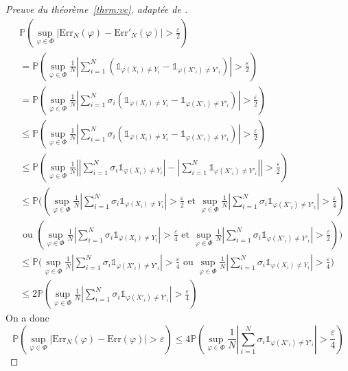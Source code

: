 \begin{proof}[Preuve du théorème~\ref{thrm:vc}, adaptée de \citet{Devroye1997}]
    \begin{align*}
        &\mathbb{P} \left( \sup_{\varphi \in \Phi} \left\vert \mathrm{Err}_N (\varphi) - \mathrm{Err}'_N (\varphi) \right\vert > \frac{\varepsilon}{2} \right) \\
        &= \mathbb{P} \left( \sup_{\varphi \in \Phi} \frac{1}{N} \left\vert \sum_{i=1}^N ( \mathds{1}_{\varphi (X_i) \neq Y_i} - \mathds{1}_{\varphi (X'_i) \neq Y'_i} )  \right\vert > \frac{\varepsilon}{2}\right) \\
        &= \mathbb{P} \left( \sup_{\varphi \in \Phi} \frac{1}{N} \left\vert \sum_{i=1}^N \sigma_i ( \mathds{1}_{\varphi (X_i) \neq Y_i} - \mathds{1}_{\varphi (X'_i) \neq Y'_i} )  \right\vert > \frac{\varepsilon}{2}\right) \\
        &\leq \mathbb{P} \left( \sup_{\varphi \in \Phi} \frac{1}{N} \left\vert \sum_{i=1}^N \sigma_i ( \mathds{1}_{\varphi (X_i) \neq Y_i} - \mathds{1}_{\varphi (X'_i) \neq Y'_i} )  \right\vert > \frac{\varepsilon}{2}\right) \\
        &\leq \mathbb{P} \left( \sup_{\varphi \in \Phi} \frac{1}{N} \left\vert \left\vert \sum_{i=1}^N \sigma_i  \mathds{1}_{\varphi (X_i) \neq Y_i} \right\vert - \left\vert \sum_{i=1}^N \mathds{1}_{\varphi (X'_i) \neq Y'_i} \right\vert  \right\vert > \frac{\varepsilon}{2}\right) \\
        &\leq \mathbb{P} \Bigg( \left( \sup_{\varphi \in \Phi} \frac{1}{N} \left\vert \sum_{i=1}^N \sigma_i \mathds{1}_{\varphi (X_i) \neq Y_i} \right\vert > \frac{\varepsilon}{2} \text{ et } \sup_{\varphi \in \Phi} \frac{1}{N} \left\vert \sum_{i=1}^N \sigma_i \mathds{1}_{\varphi (X'_i) \neq Y'_i} \right\vert > \frac{\varepsilon}{4} \right) \\
        &\text{ ou } \left( \sup_{\varphi \in \Phi} \frac{1}{N} \left\vert \sum_{i=1}^N \sigma_i \mathds{1}_{\varphi (X_i) \neq Y_i} \right\vert > \frac{\varepsilon}{4} \text{ et } \sup_{\varphi \in \Phi} \frac{1}{N} \left\vert \sum_{i=1}^N \sigma_i \mathds{1}_{\varphi (X'_i) \neq Y'_i} \right\vert > \frac{\varepsilon}{2} \right) \Bigg)\\
        &\leq \mathbb{P} \Bigg( \sup_{\varphi \in \Phi} \frac{1}{N} \left\vert \sum_{i=1}^N \sigma_i \mathds{1}_{\varphi (X'_i) \neq Y'_i} \right\vert > \frac{\varepsilon}{4} \text{ ou } \sup_{\varphi \in \Phi} \frac{1}{N} \left\vert \sum_{i=1}^N \sigma_i \mathds{1}_{\varphi (X_i) \neq Y_i} \right\vert > \frac{\varepsilon}{4} \Bigg)\\
        &\leq 2 \mathbb{P} \left( \sup_{\varphi \in \Phi} \frac{1}{N} \left\vert \sum_{i=1}^N \sigma_i \mathds{1}_{\varphi (X'_i) \neq Y'_i} \right\vert > \frac{\varepsilon}{4} \right)
    \end{align*}
    On a donc
    \begin{equation*}
        \mathbb{P} \left( \sup_{\varphi \in \Phi} \left\vert \mathrm{Err}_N (\varphi) - \mathrm{Err} (\varphi) \right\vert > \varepsilon \right) \leq 4 \mathbb{P} \left( \sup_{\varphi \in \Phi} \frac{1}{N} \left\vert \sum_{i=1}^N \sigma_i \mathds{1}_{\varphi (X'_i) \neq Y'_i} \right\vert > \frac{\varepsilon}{4} \right)
    \end{equation*}
    

\end{proof}
